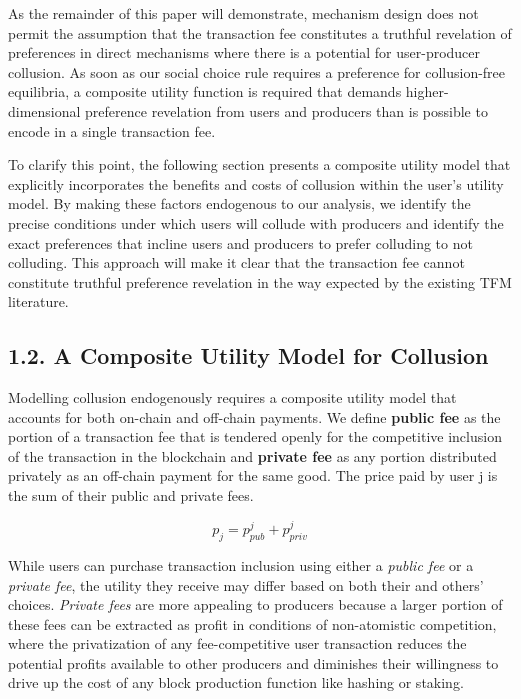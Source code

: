\documentclass[oneside]{article}   	%
\begin{document}
As the remainder of this paper will demonstrate, mechanism design does not permit the assumption that the transaction fee constitutes a truthful revelation of preferences in direct mechanisms where there is a potential for user-producer collusion. As soon as our social choice rule requires a preference for collusion-free equilibria, a composite utility function is required that demands higher-dimensional preference revelation from users and producers than is possible to encode in a single transaction fee.

To clarify this point, the following section presents a composite utility model that explicitly incorporates the benefits and costs of collusion within the user's utility model. By making these factors endogenous to our analysis, we identify the precise conditions under which users will collude with producers and identify the exact preferences that incline users and producers to prefer colluding to not colluding. This approach will make it clear that the transaction fee cannot constitute truthful preference revelation in the way expected by the existing TFM literature.

\subsection*{1.2. A Composite Utility Model for Collusion}
\vspace{0.5em}

Modelling collusion endogenously requires a composite utility model that accounts for both on-chain and off-chain payments. We define \textbf{public fee} as the portion of a transaction fee that is tendered openly for the competitive inclusion of the transaction in the blockchain and \textbf{private fee} as any portion distributed privately as an off-chain payment for the same good. The price paid by user j is the sum of their public and private fees.

$$
p_j = p_{pub}^j + p_{priv}^j
$$

While users can purchase transaction inclusion using either a \textit{public fee} or a \textit{private fee}, the utility they receive may differ based on both their and others' choices. \textit{Private fees} are more appealing to producers because a larger portion of these fees can be extracted as profit in conditions of non-atomistic competition, where the privatization of any fee-competitive user transaction reduces the potential profits available to other producers and diminishes their willingness to drive up the cost of any block production function like hashing or staking.
\end{document}
